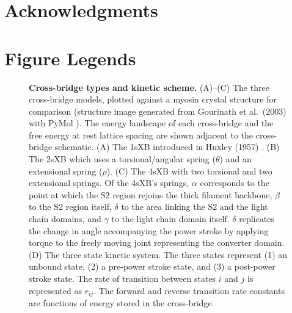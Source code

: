 \documentclass[10pt]{article}
\newcommand{\citep}[1]{\cite{#1}} %
\begin{document}



\section*{Acknowledgments} %



\clearpage




\clearpage
\section*{Figure Legends} %

\begin{figure}[!ht]
    \begin{center}
    \end{center}
    \caption{ \textbf{Cross-bridge types and kinetic scheme.} 
        (A)--(C) The three cross-bridge models, plotted against a myosin crystal structure for comparison (structure image generated from Gourinath et al.~(2003) \protect\citep{Gourinath2003} with PyMol \protect\citep{pymol}).
        The energy landscape of each cross-bridge and the free energy at rest lattice spacing are shown adjacent to the cross-bridge schematic.
        (A) The 1sXB introduced in Huxley (1957) \protect\citep{Huxley1957}. 
        (B) The 2sXB which uses a torsional/angular spring ($\theta$) and an extensional spring ($\rho$). 
        (C) The 4sXB with two torsional and two extensional springs.
        Of the 4sXB's springs, $\alpha$ corresponds to the point at which the S2 region rejoins the thick filament backbone, $\beta$ to the S2 region itself, $\delta$ to the area linking the S2 and the light chain domains, and $\gamma$ to the light chain domain itself.
        $\delta$ replicates the change in angle accompanying the power stroke by applying torque to the freely moving joint representing the converter domain.
        (D)  The three state kinetic system. 
        The three states represent (1) an unbound state, (2) a pre-power stroke state, and (3) a post-power stroke state. 
        The rate of transition between states $i$ and $j$ is represented as $r_{ij}$. 
        The forward and reverse transition rate constants are functions of energy stored in the cross-bridge. 
        }
    \label{fig_xb_types}
\end{figure}
\end{document}
